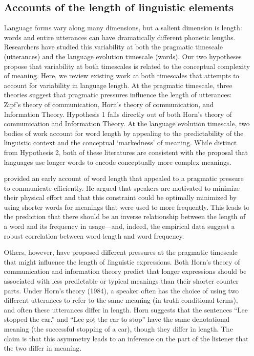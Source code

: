 \subsection{Accounts of the length of linguistic elements}

Language forms vary along many dimensions, but a salient dimension is length: words and entire utterances can have dramatically different phonetic lengths. Researchers have studied this variability at both the pragmatic timescale (utterances) and the language evolution timescale (words). Our two hypotheses propose that variability at both timescales is related to the conceptual complexity of meaning. Here, we review existing work at both timescales that attempts to account for variability in language length. At the pragmatic timescale, three theories suggest that pragmatic pressures influence the length of utterances: Zipf's theory of communication, Horn's theory of communication, and Information Theory. Hypothesis 1 falls directly out of both Horn's theory of communication and Information Theory. At the language evolution timescale, two bodies of work account for word length by appealing to the predictability of the linguistic context and the conceptual `markedness' of meaning. While distinct from Hypothesis 2, both of these literatures are consistent with the proposal that languages use longer words to encode conceptually more complex meanings.

 provided an early account of word length that appealed to a pragmatic pressure to communicate efficiently. He argued that speakers are motivated to minimize their physical effort and that this constraint could be optimally minimized by using shorter words for meanings that were used to more frequently. This leads to the prediction that there should be an inverse relationship between the length of a word and its frequency in usage---and, indeed, the empirical data suggest a robust correlation between word length and word frequency.

Others, however, have proposed different pressures at the pragmatic timescale that might influence the length of linguistic expressions. Both Horn's theory of communication and information theory predict that longer expressions should be associated with less predictable or typical meanings than their shorter counter parts. Under Horn's theory (1984), a speaker often has the choice of using two different utterances to refer to the same meaning (in truth conditional terms), and often these utterances differ in length. Horn suggests that the sentences ``Lee stopped the car.'' and ``Lee got the car to stop'' have the same denotational meaning (the successful stopping of a car), though they differ in length. The claim is that this asymmetry leads to an inference on the part of the listener that the two differ in meaning.

